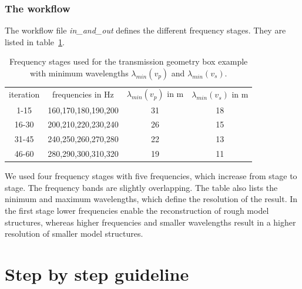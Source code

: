 \subsubsection*{The workflow}
The workflow file \textit{in\_and\_out} defines the different frequency stages. They are listed in table~\ref{tab:toy_fstage}.\\
\begin{table}[h!]
\centering 
\begin{tabular}{|c|c|c|c|}\hline
 iteration& frequencies in Hz & $\lambda_{min}(v_p)$ in m &$\lambda_{min}(v_s)$ in m \\
 1-15& 160,170,180,190,200 & 31 & 18\\
16-30& 200,210,220,230,240 & 26 & 15\\
31-45& 240,250,260,270,280 & 22 & 13\\
46-60& 280,290,300,310,320 & 19 & 11\\
\hline
\end{tabular}
\caption[Transmission example: frequency stages]{Frequency stages used for the transmission geometry box example with minimum wavelengths $\lambda_{min}(v_p)$ and $\lambda_{min}(v_s)$.}
\label{tab:toy_fstage}
\end{table}
We used four frequency stages with five frequencies, which increase from stage to stage. The frequency bands are slightly overlapping. The table  also lists the ninimum and maximum wavelengths, which define the resolution of the result. In the first stage lower frequencies enable the reconstruction of rough model structures, whereas higher frequencies and smaller wavelengths result in a higher resolution of smaller model structures.
\section{Step by step guideline}
